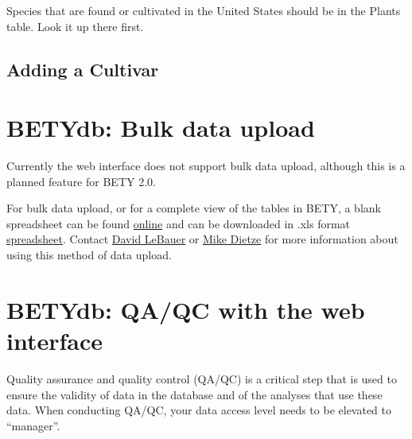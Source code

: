 \documentclass[12pt,english,portrait]{article}
\begin{document}
 Species that are found or cultivated in the United States should be in the Plants table. 
 Look it up there first.

\subsection{Adding a Cultivar}\label{sec:addcultivar}
\section{BETYdb: Bulk data upload}

 Currently the web interface does not support bulk data upload, although this is a planned feature for BETY 2.0.
 
 For bulk data upload, or for a complete view of the tables in BETY, a blank spreadsheet can be found \href{https://spreadsheets0.google.com/spreadsheet/pub?hl=en&hl=en&key=0Ai_PDCcY5g2JdFN1UDJJdjNsZk9RM0Z6bnFDdlQ0clE&output=html}{online} and can be downloaded in .xls format \href{https://spreadsheets0.google.com/spreadsheet/pub?hl=en&hl=en&key=0Ai_PDCcY5g2JdFN1UDJJdjNsZk9RM0Z6bnFDdlQ0clE&output=xls}{spreadsheet}. 
 Contact \href{mailto:dlebauer@illinois.edu}{David LeBauer} or \href{mailto:mdietze@illinois.edu}{Mike Dietze} for more information about using this method of data upload.

\section{BETYdb: QA/QC with the web interface}
 Quality assurance and quality control (QA/QC) is a critical step that is used to ensure the validity of data in the database and of the analyses that use these data.
 When conducting QA/QC, your data access level needs to be elevated to ``manager''.
 
\end{document}
